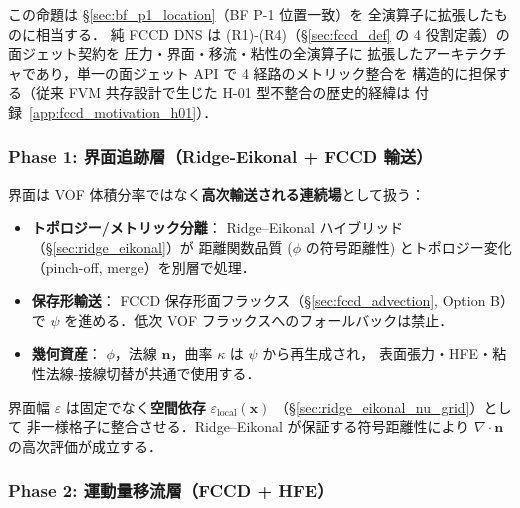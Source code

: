 この命題は §\ref{sec:bf_p1_location}（BF P-1 位置一致）を
全演算子に拡張したものに相当する．
純 FCCD DNS は (R1)-(R4)（§\ref{sec:fccd_def} の 4 役割定義）の面ジェット契約を
圧力・界面・移流・粘性の全演算子に
拡張したアーキテクチャであり，単一の面ジェット API で 4 経路のメトリック整合を
構造的に担保する（従来 FVM 共存設計で生じた H-01 型不整合の歴史的経緯は
付録~\ref{app:fccd_motivation_h01}）．

\subsubsection{Phase 1: 界面追跡層（Ridge-Eikonal + FCCD 輸送）}
\label{sec:pure_fccd_phase1}

界面は VOF 体積分率ではなく\textbf{高次輸送される連続場}として扱う：
\begin{itemize}[noitemsep]
  \item \textbf{トポロジー/メトリック分離}：
        Ridge--Eikonal ハイブリッド（§\ref{sec:ridge_eikonal}）が
        距離関数品質 ($\phi$ の符号距離性) とトポロジー変化
        （pinch-off, merge）を別層で処理．
  \item \textbf{保存形輸送}：
        FCCD 保存形面フラックス（§\ref{sec:fccd_advection}, Option B）で
        $\psi$ を進める．低次 VOF フラックスへのフォールバックは禁止．
  \item \textbf{幾何資産}：
        $\phi$，法線 $\mathbf{n}$，曲率 $\kappa$ は
        $\psi$ から再生成され，
        表面張力・HFE・粘性法線-接線切替が共通で使用する．
\end{itemize}

界面幅 $\varepsilon$ は固定でなく\textbf{空間依存} $\varepsilon_\text{local}(\mathbf{x})$
（§\ref{sec:ridge_eikonal_nu_grid}）として
非一様格子に整合させる．Ridge--Eikonal が保証する符号距離性により
$\nabla\cdot\mathbf{n}$ の高次評価が成立する．

\subsubsection{Phase 2: 運動量移流層（FCCD + HFE）}
\label{sec:pure_fccd_phase2}

